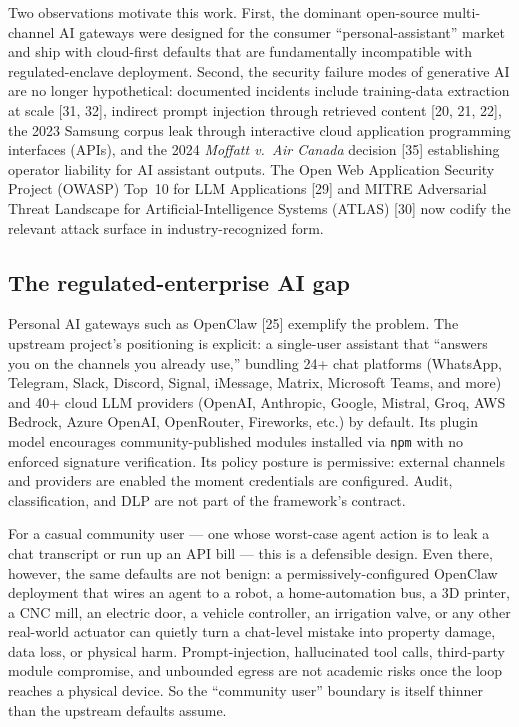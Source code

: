 \documentclass[11pt]{article}
\begin{document}
Two observations motivate this work. First, the dominant open-source
multi-channel AI gateways were designed for the consumer
``personal-assistant'' market and ship with cloud-first defaults that
are fundamentally incompatible with regulated-enclave deployment.
Second, the security failure modes of generative AI are no longer
hypothetical: documented incidents include training-data extraction at
scale [31, 32], indirect prompt injection through retrieved content
[20, 21, 22], the 2023 Samsung corpus leak through interactive cloud
application programming interfaces (APIs), and the 2024 \emph{Moffatt
v.\ Air Canada} decision [35] establishing operator liability for AI
assistant outputs. The Open Web Application Security Project (OWASP)
Top~10 for LLM Applications [29] and MITRE Adversarial Threat Landscape
for Artificial-Intelligence Systems (ATLAS) [30] now codify the
relevant attack surface in industry-recognized form.

\subsection{The regulated-enterprise AI gap}

Personal AI gateways such as OpenClaw [25] exemplify the problem. The
upstream project's positioning is explicit: a single-user assistant
that ``answers you on the channels you already use,'' bundling 24+
chat platforms (WhatsApp, Telegram, Slack, Discord, Signal, iMessage,
Matrix, Microsoft Teams, and more) and 40+ cloud LLM providers (OpenAI,
Anthropic, Google, Mistral, Groq, AWS Bedrock, Azure OpenAI, OpenRouter,
Fireworks, etc.) by default. Its plugin model encourages
community-published modules installed via \texttt{npm} with no enforced
signature verification. Its policy posture is permissive: external
channels and providers are enabled the moment credentials are
configured. Audit, classification, and DLP are not part of the
framework's contract.

For a casual community user --- one whose worst-case agent action is
to leak a chat transcript or run up an API bill --- this is a
defensible design. Even there, however, the same defaults are not
benign: a permissively-configured OpenClaw deployment that wires an
agent to a robot, a home-automation bus, a 3D printer, a CNC mill, an
electric door, a vehicle controller, an irrigation valve, or any
other real-world actuator can quietly turn a chat-level mistake into
property damage, data loss, or physical harm. Prompt-injection,
hallucinated tool calls, third-party module compromise, and unbounded
egress are not academic risks once the loop reaches a physical
device. So the ``community user'' boundary is itself thinner than the
upstream defaults assume.
\end{document}
